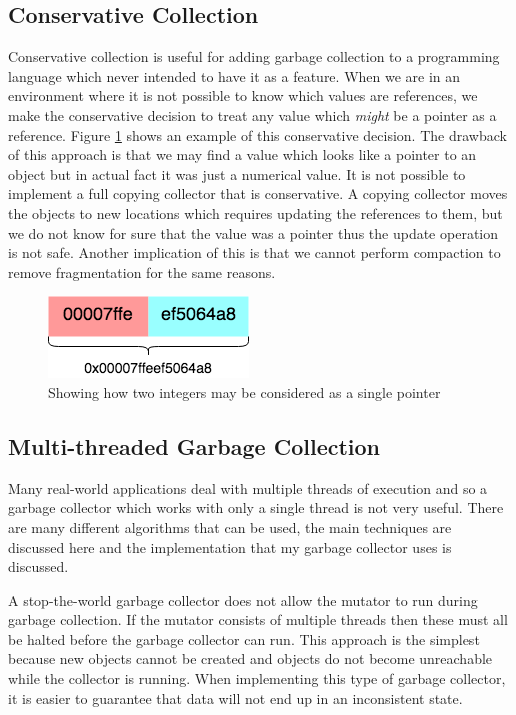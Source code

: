 \documentclass[../diss.tex]{subfiles}
\begin{document}
\subsection{Conservative Collection} \label{lab:conservative}

Conservative collection\cite{conservative} is useful for adding garbage collection to a programming language which never intended to have it as a feature. When we are in an environment where it is not possible to know which values are references, we make the conservative decision to treat any value which \emph{might} be a pointer as a reference. Figure \ref{fig:conservative} shows an example of this conservative decision. The drawback of this approach is that we may find a value which looks like a pointer to an object but in actual fact it was just a numerical value. It is not possible to implement a full copying collector that is conservative. A copying collector moves the objects to new locations which requires updating the references to them, but we do not know for sure that the value was a pointer thus the update operation is not safe. Another implication of this is that we cannot perform compaction to remove fragmentation for the same reasons.

\begin{figure}
    \centering
    \includegraphics{figs/conservative.png}
    \caption{Showing how two integers may be considered as a single pointer}
    \label{fig:conservative}
\end{figure}

\subsection{Multi-threaded Garbage Collection} \label{sec:multithreadingmodels}

Many real-world applications deal with multiple threads of execution and so a garbage collector which works with only a single thread is not very useful. There are many different algorithms that can be used, the main techniques are discussed here and the implementation that my garbage collector uses is discussed.

A stop-the-world garbage collector does not allow the mutator to run during garbage collection. If the mutator consists of multiple threads then these must all be halted before the garbage collector can run. This approach is the simplest because new objects cannot be created and objects do not become unreachable while the collector is running. When implementing this type of garbage collector, it is easier to guarantee that data will not end up in an inconsistent state.
\end{document}
